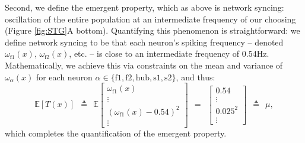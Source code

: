 \documentclass[11pt]{article}
\begin{document}
Second, we define the emergent property, which as above is network syncing: oscillation of the entire population at an intermediate frequency of our choosing (Figure \ref{fig:STG}A bottom).
Quantifying this phenomenon is straightforward: we define network syncing to be that each neuron's spiking frequency -- denoted $\omega_{\text{f1}}(x)$, $\omega_{\text{f2}}(x)$, etc. -- is close to an intermediate frequency of 0.54Hz.  
Mathematically, we achieve this via constraints on the mean and variance of $\omega_\alpha(x)$ for each neuron $\alpha \in \{ \text{f1}, \text{f2}, \text{hub}, \text{s1}, \text{s2} \}$, and thus:
\begin{equation}\label{eq:EP}
 \mathbb{E}\left[T(x) \right] ~~\triangleq~~ \mathbb{E}\begin{bmatrix} \omega_{\text{f1}}(x) \\ \vdots \\ (\omega_{\text{f1}}(x) - 0.54)^2 \\ \vdots \end{bmatrix} ~~=~~  
 \begin{bmatrix} 0.54 \\ \vdots \\ 0.025^2 \\ \vdots \end{bmatrix} ~~\triangleq~~ \mu,
 \end{equation}
  which completes the quantification of the emergent property.
\end{document}
